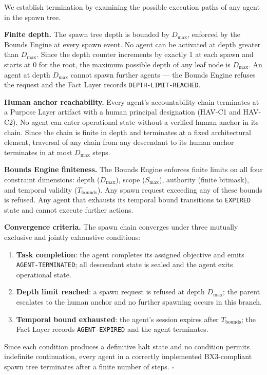 \begin{Proof}
We establish termination by examining the possible execution paths of any agent in the spawn tree.

\medskip
\noindent\textbf{Finite depth.} The spawn tree depth is bounded by $D_{\max}$, enforced by the Bounds Engine at every spawn event. No agent can be activated at depth greater than $D_{\max}$. Since the depth counter increments by exactly 1 at each spawn and starts at 0 for the root, the maximum possible depth of any leaf node is $D_{\max}$. An agent at depth $D_{\max}$ cannot spawn further agents — the Bounds Engine refuses the request and the Fact Layer records \texttt{DEPTH-LIMIT-REACHED}.

\medskip
\noindent\textbf{Human anchor reachability.} Every agent's accountability chain terminates at a Purpose Layer artifact with a human principal designation (HAV-C1 and HAV-C2). No agent can enter operational state without a verified human anchor in its chain. Since the chain is finite in depth and terminates at a fixed architectural element, traversal of any chain from any descendant to its human anchor terminates in at most $D_{\max}$ steps.

\medskip
\noindent\textbf{Bounds Engine finiteness.} The Bounds Engine enforces finite limits on all four constraint dimensions: depth ($D_{\max}$), scope ($S_{\max}$), authority (finite bitmask), and temporal validity ($T_{\text{bounds}}$). Any spawn request exceeding any of these bounds is refused. Any agent that exhausts its temporal bound transitions to \texttt{EXPIRED} state and cannot execute further actions.

\medskip
\noindent\textbf{Convergence criteria.} The spawn chain converges under three mutually exclusive and jointly exhaustive conditions:
\begin{enumerate}
  \item[(CC-1)] \textbf{Task completion}: the agent completes its assigned objective and emits \texttt{AGENT-TERMINATED}; all descendant state is sealed and the agent exits operational state.
  \item[(CC-2)] \textbf{Depth limit reached}: a spawn request is refused at depth $D_{\max}$; the parent escalates to the human anchor and no further spawning occurs in this branch.
  \item[(CC-3)] \textbf{Temporal bound exhausted}: the agent's session expires after $T_{\text{bounds}}$; the Fact Layer records \texttt{AGENT-EXPIRED} and the agent terminates.
\end{enumerate}

Since each condition produces a definitive halt state and no condition permits indefinite continuation, every agent in a correctly implemented BX3-compliant spawn tree terminates after a finite number of steps. $\square$
\end{Proof}


